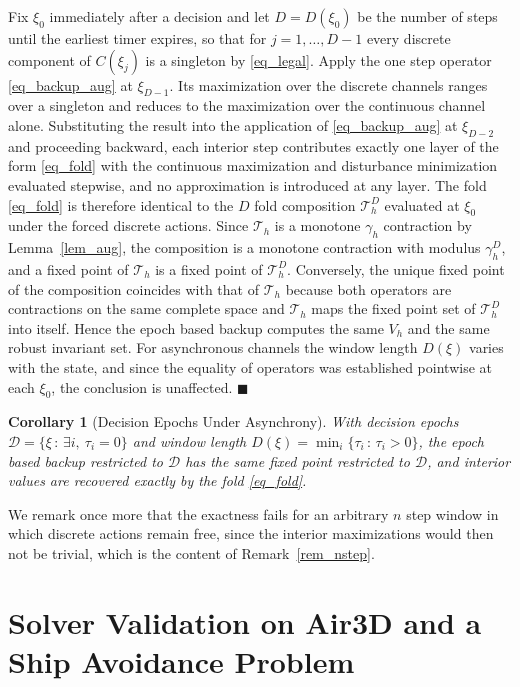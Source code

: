 \documentclass[journal]{IEEEtran}
\newtheorem{corollary}{Corollary}
\begin{document}
Fix $\xi_0$ immediately after a decision and let $D = D(\xi_0)$ be the number of steps until the earliest timer expires, so that for $j = 1, \ldots, D-1$ every discrete component of $C(\xi_j)$ is a singleton by \eqref{eq_legal}. Apply the one step operator \eqref{eq_backup_aug} at $\xi_{D-1}$. Its maximization over the discrete channels ranges over a singleton and reduces to the maximization over the continuous channel alone. Substituting the result into the application of \eqref{eq_backup_aug} at $\xi_{D-2}$ and proceeding backward, each interior step contributes exactly one layer of the form \eqref{eq_fold} with the continuous maximization and disturbance minimization evaluated stepwise, and no approximation is introduced at any layer. The fold \eqref{eq_fold} is therefore identical to the $D$ fold composition $\mathcal{T}_h^{D}$ evaluated at $\xi_0$ under the forced discrete actions. Since $\mathcal{T}_h$ is a monotone $\gamma_h$ contraction by Lemma~\ref{lem_aug}, the composition is a monotone contraction with modulus $\gamma_h^{D}$, and a fixed point of $\mathcal{T}_h$ is a fixed point of $\mathcal{T}_h^{D}$. Conversely, the unique fixed point of the composition coincides with that of $\mathcal{T}_h$ because both operators are contractions on the same complete space and $\mathcal{T}_h$ maps the fixed point set of $\mathcal{T}_h^{D}$ into itself. Hence the epoch based backup computes the same $V_h$ and the same robust invariant set. For asynchronous channels the window length $D(\xi)$ varies with the state, and since the equality of operators was established pointwise at each $\xi_0$, the conclusion is unaffected. $\blacksquare$

\begin{corollary}[Decision Epochs Under Asynchrony]
With decision epochs $\mathcal{D} = \{\xi \,:\, \exists i,\ \tau_i = 0\}$ and window length $D(\xi) = \min_{i} \{\tau_i \,:\, \tau_i > 0\}$, the epoch based backup restricted to $\mathcal{D}$ has the same fixed point restricted to $\mathcal{D}$, and interior values are recovered exactly by the fold \eqref{eq_fold}.
\end{corollary}

We remark once more that the exactness fails for an arbitrary $n$ step window in which discrete actions remain free, since the interior maximizations would then not be trivial, which is the content of Remark~\ref{rem_nstep}.

\section{Solver Validation on Air3D and a Ship Avoidance Problem}\label{app_air3d}
\end{document}
